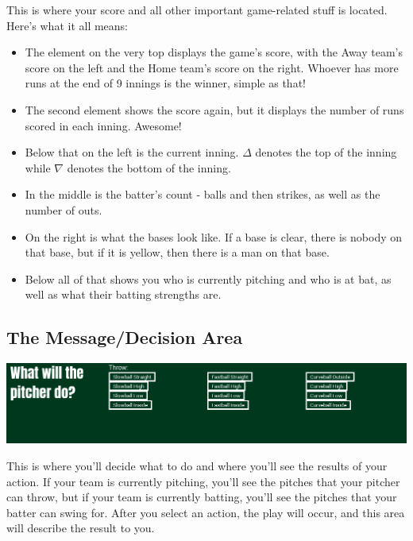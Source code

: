 \documentclass[12pt,a4paper]{report}
\begin{document}
This is where your score and all other important game-related stuff is located. Here's what it all means:\\
\begin{itemize}
	\item The element on the very top displays the game's score, with the Away team's score on the left and the Home team's score on the right. Whoever has more runs at the end of 9 innings is the winner, simple as that!
	\item The second element shows the score again, but it displays the number of runs scored in each inning. Awesome!
	\item Below that on the left is the current inning. $ \Delta $ denotes the top of the inning while $ \nabla $ denotes the bottom of the inning.
	\item In the middle is the batter's count - balls and then strikes, as well as the number of outs.
	\item On the right is what the bases look like. If a base is clear, there is nobody on that base, but if it is yellow, then there is a man on that base.
	\item Below all of that shows you who is currently pitching and who is at bat, as well as what their batting strengths are.
\end{itemize}

\subsection{The Message/Decision Area}
\begin{center}
	\includegraphics[width=1\linewidth]{umInclude/message}
\end{center}
This is where you'll decide what to do and where you'll see the results of your action. If your team is currently pitching, you'll see the pitches that your pitcher can throw, but if your team is currently batting, you'll see the pitches that your batter can swing for. After you select an action, the play will occur, and this area will describe the result to you.
\end{document}
